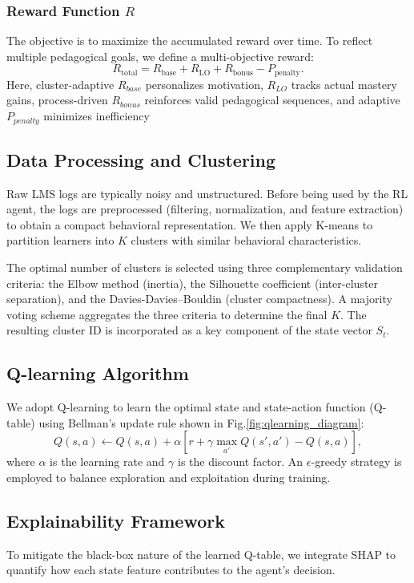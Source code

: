 \documentclass[9pt, conference, a4paper, compsocconf]{IEEEtran}
\begin{document}
\subsubsection{Reward Function $R$}
The objective is to maximize the accumulated reward over time. To reflect multiple pedagogical goals, we define a multi-objective reward:
\begin{equation}
R_{\text{total}} = R_{\text{base}} + R_{\text{LO}} + R_{\text{bonus}} - P_{\text{penalty}}.
\end{equation}
Here, cluster-adaptive $R_{base}$ personalizes motivation, $R_{LO}$ tracks actual mastery gains, process-driven $R_{bonus}$ reinforces valid pedagogical sequences, and adaptive $P_{penalty}$ minimizes inefficiency

\subsection{Data Processing and Clustering}
Raw LMS logs are typically noisy and unstructured. Before being used by the RL agent, the logs are preprocessed (filtering, normalization, and feature extraction) to obtain a compact behavioral representation. We then apply K-means to partition learners into $K$ clusters with similar behavioral characteristics.

The optimal number of clusters is selected using three complementary validation criteria: the Elbow method (inertia), the Silhouette coefficient (inter-cluster separation), and the Davies-Davies–Bouldin (cluster compactness). A majority voting scheme aggregates the three criteria to determine the final $K$. The resulting cluster ID is incorporated as a key component of the state vector $S_t$.

\subsection{Q-learning Algorithm}
We adopt Q-learning to learn the optimal state and state-action function (Q-table) using Bellman's update rule shown in Fig.\ref{fig:qlearning_diagram}:
\begin{equation}
Q(s, a) \leftarrow Q(s, a) + \alpha \left[r + \gamma \max_{a'} Q(s', a') - Q(s, a)\right],
\end{equation}
where $\alpha$ is the learning rate and $\gamma$ is the discount factor. An $\epsilon$-greedy strategy is employed to balance exploration and exploitation during training.

\subsection{Explainability Framework}
To mitigate the black-box nature of the learned Q-table, we integrate SHAP \cite{lundberg2017unified} to quantify how each state feature contributes to the agent's decision.
\end{document}
